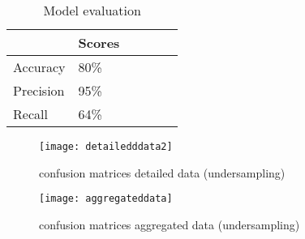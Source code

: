 \documentclass[runningheads]{llncs}
\begin{document}
\iffalse
ogistic re-gression (LR) and artificial neural networks (ANN).These models have their origins in two different com-munities (statistics and computer science), but sharemany similarities. sta-tistical pattern recognition

This section measures the performance in terms of accuracy, precision and recall (Table~\ref{tab:evaluation}) of the chosen classification technique - logistic regression. Accuracy means that ``how often is the classifier correct?" Thus, the proposed algorithm has an accuracy of 80\%, that is, for each 100 ``machineOn = 1" or ``machineOn = 0" types it classified, 80 were correctly classified. Precision means that ``when the model predicts the positive result ``MachineOn = 1", how often is it correct?"
\fi

\begin{table}[]
\label{tab:distance}
\centering
\caption{Model evaluation}
\begin{tabular}{p{2.4cm}p{1.6cm}p{1.6cm}p{1.6cm}p{1.6cm}p{1.6cm}}
\hline
\multicolumn{1}{l}{\textbf{}} &  \textbf{Scores} \\ \hline
Accuracy      &        80\% \\
Precision     &         95\%\\
Recall         &        64\%\\
\hline
\end{tabular}
\label{tab:evaluation}
\end{table}

\iffalse
 Hence, the algorithm has a precision of 95\%, which means for every 100 ``MachineOn = 1" types it classified, 95 were correctly classified. Recall means that “when it is actually the positive result ``MachineOn = 1", how often does it predict correctly?” As a result, it has a recall of 64\% that means for each 100 ``MachineOn = 1" types it classified in the test data set, 64 were correctly classified.


\fi







\begin{figure}
\centering
\texttt{[image: detailedddata2]} 
\caption{confusion matrices detailed data (undersampling)}
\label{fig:confusion}
\end{figure}

\begin{figure}
\centering
\texttt{[image: aggregateddata]} 
\caption{confusion matrices aggregated data (undersampling)}
\label{fig:confusion}
\end{figure}
\end{document}
